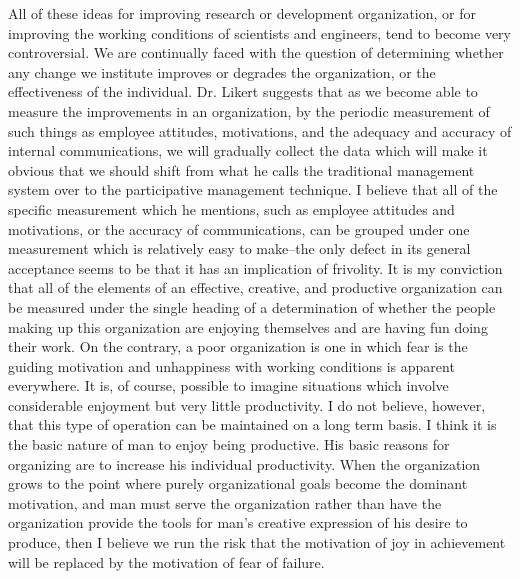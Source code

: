 \documentclass{article}
\begin{document}
All of these ideas for improving research or development organization, or for improving the working conditions of scientists and engineers, tend to become very controversial. We are continually faced with the question of determining whether any change we institute improves or degrades the organization, or the effectiveness of the individual. Dr. Likert suggests that as we become able to measure the improvements in an organization, by the periodic measurement of such things as employee attitudes, motivations, and the adequacy and accuracy of internal communications, we will gradually collect the data which will make it obvious that we should shift from what he calls the traditional management system over to the participative management technique. I believe that all of the specific measurement which he mentions, such as employee attitudes and motivations, or the accuracy of communications, can be grouped under one measurement which is relatively easy to make--the only defect in its general acceptance seems to be that it has an implication of frivolity. It is my conviction that all of the elements of an effective, creative, and productive organization can be measured under the single heading of a determination of whether the people making up this organization are enjoying themselves and are having fun doing their work. On the contrary, a poor organization is one in which fear is the guiding motivation and unhappiness with working conditions is apparent everywhere. It is, of course, possible to imagine situations which involve considerable enjoyment but very little productivity. I do not believe, however, that this type of operation can be maintained on a long term basis. I think it is the basic nature of man to enjoy being productive. His basic reasons for organizing are to increase his individual productivity. When the organization grows to the point where purely organizational goals become the dominant motivation, and man must serve the organization rather than have the organization provide the tools for man's creative expression of his desire to produce, then I believe we run the risk that the motivation of joy in achievement will be replaced by the motivation of fear of failure.
\end{document}
